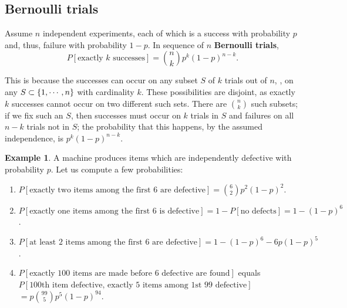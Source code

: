 \documentclass[12pt,a4paper]{article}
\theoremstyle{definition}
\newtheorem{example}{Example}[section]
\theoremstyle{definition}
\theoremstyle{definition}
\theoremstyle{definition}
\theoremstyle{remark}
\theoremstyle{definition}
\newcommand{\dispsty}{\displaystyle}
\newcommand{\ie}{\text{i.e.}}
\begin{document}
\subsection{Bernoulli trials}
\begin{tcolorbox}[colback=white]
	Assume $n$ independent experiments, each of which is a success with probability $p$ and, thus, failure with probability $1-p$. In sequence of $n$ \textbf{Bernoulli trials}, \[
	P[\text{exactly $k$ successes}]=\binom{n}{k}p^k(1-p)^{n-k}.
	\]
\end{tcolorbox} This is because the successes can occur on any subset $S$ of $k$ trials out of $n$, \ie, on any $S\subset\set{1,\cdots,n}$ with cardinality $k$. These possibilities are disjoint, as exactly $k$ successes cannot occur on two different such sets. There are $\binom{n}{k}$ such subsets; if we fix such an $S$, then successes must occur on $k$ trials in $S$ and failures on all $n-k$ trials not in $S$; the probability that this happens, by the assumed independence, is $p^k(1-p)^{n-k}$.
\\
\begin{example}
	A machine produces items which are independently defective with probability $p$. Let us compute a few probabilities: \begin{enumerate}
		\item $P[\text{exactly two items among the first 6 are defective}]=\dispsty\binom{6}{2}p^2(1-p)^2$.
		\item $P[\text{exactly one items among the first 6 is defective}]=1-P[\text{no defects}]=1-(1-p)^6$.
		\item $P[\text{at least 2 items among the first 6 are defective}]=1-(1-p)^6-6p(1-p)^5$.
		\item $P[\text{exactly 100 items are made before 6 defective are found}]$ equals\\ $P[\text{100th item defective, exactly 5 items among 1st 99 defective}]$$=\dispsty p\binom{99}{5}p^5(1-p)^{94}$.
	\end{enumerate}
\end{example}
\
\end{document}
